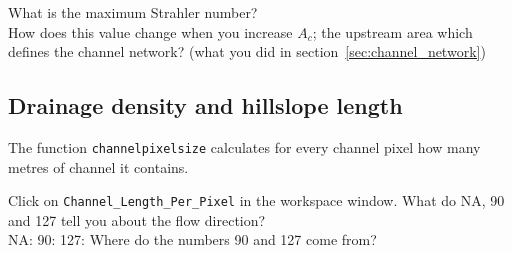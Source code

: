 \documentclass[twocolumn, 10pt, a4paper]{article}
\newenvironment{PC_prac_environment}{
\def\Q{\noindent \color{Gray}\rule[-0.1cm]{\columnwidth}{1.5pt}  \color{black} } \let\ques\Q 
\def\nQ{\noindent \color{black} } \let\ques\nQ 
\def\E{\color{Gray}\rule[0.3cm]{\columnwidth}{1.5pt} \color{black}} \let\ques\E }
\newcommand{\A}[2] { \ifthenelse{\boolean{showanswer}} {\noindent \color{cyan}{#2}\color{black}} {\multido{}{#1}{\noindent \color{light-gray}\hrulefill\\} } }
\begin{document}
\begin{PC_prac_environment}
\Q What is the maximum Strahler number?\\
\nQ How does this value change when you increase $A_c$; the upstream area which defines the channel network? (what you did in section~\ref{sec:channel_network})\\
\E


\subsection{Drainage density and hillslope length}
\label{sec:dd}
The function \texttt{channelpixelsize} calculates for every channel pixel how many metres of channel it contains. 

\Q Click on \verb!Channel_Length_Per_Pixel! in the workspace window. What do NA, 90 and 127 tell you about the flow direction?\\
NA:
90:
127:
\nQ Where do the numbers 90 and 127 come from?\\
\E


\end{PC_prac_environment}
\end{document}
